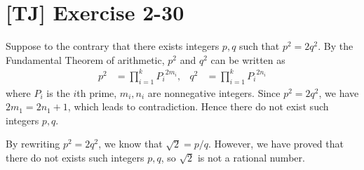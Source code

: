 \documentclass[a4paper,11pt,twocolumn]{article}
\begin{document}
  \section{[TJ] Exercise 2-30}
  Suppose to the contrary that there exists integers $p, q$ such that $p^2 = 2q^2$. By the Fundamental Theorem of arithmetic, $p^2$ and $q^2$ can be written as
  \begin{align*}
    p^2 &= \prod_{i=1}^{k} {P_i}^{2m_i},  &  q^2 &= \prod_{i=1}^{k} {P_i}^{2n_i}
  \end{align*}
  where $P_i$ is the $i$th prime, $m_i, n_i$ are nonnegative integers. Since $p^2 = 2q^2$, we have $2m_1 = 2n_1 + 1$, which leads to contradiction. Hence there do not exist such integers $p, q$. \par
  By rewriting $p^2 = 2q^2$, we know that $\sqrt{2} = p/q$. However, we have proved that there do not exists such integers $p, q$, so $\sqrt{2}$ is not a rational number.
\end{document}
